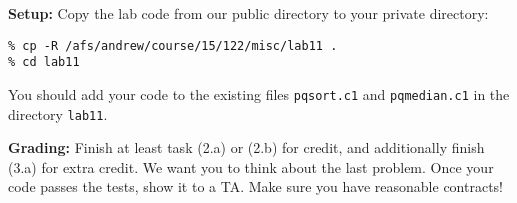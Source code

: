 \documentclass[lab]{inc/122handout}
\begin{document}
\labcollab

\textbf{Setup:} Copy the lab code from our public directory to your private
directory:

\begin{lstlisting}[language={[coin]C}]
% cd private/15122
% cp -R /afs/andrew/course/15/122/misc/lab11 .
% cd lab11
\end{lstlisting}

You should add your code to the existing files \lstinline'pqsort.c1' and
\lstinline'pqmedian.c1' in the directory \lstinline'lab11'.

\textbf{Grading:} Finish at least task (2.a) or (2.b) for credit, and
additionally finish (3.a) for extra credit.  We want you to think about the
last problem. Once your code passes the tests, show it to a TA. Make sure you
have reasonable contracts!

\end{document}

